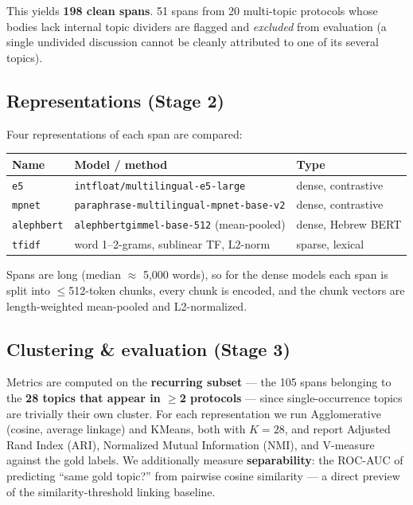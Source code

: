 \documentclass[11pt,a4paper]{article}
\begin{document}
This yields \textbf{198 clean spans}. 51 spans from 20 multi-topic protocols whose bodies lack
internal topic dividers are flagged and \emph{excluded} from evaluation (a single undivided
discussion cannot be cleanly attributed to one of its several topics).

\subsection{Representations (Stage 2)}

Four representations of each span are compared:

\begin{center}
\begin{tabular}{lll}
\toprule
\textbf{Name} & \textbf{Model / method} & \textbf{Type} \\
\midrule
\texttt{e5}        & \texttt{intfloat/multilingual-e5-large} & dense, contrastive \\
\texttt{mpnet}     & \texttt{paraphrase-multilingual-mpnet-base-v2} & dense, contrastive \\
\texttt{alephbert} & \texttt{alephbertgimmel-base-512} (mean-pooled) & dense, Hebrew BERT \\
\texttt{tfidf}     & word 1--2-grams, sublinear TF, L2-norm & sparse, lexical \\
\bottomrule
\end{tabular}
\end{center}

Spans are long (median $\approx$ 5{,}000 words), so for the dense models each span is split into
$\le$512-token chunks, every chunk is encoded, and the chunk vectors are length-weighted
mean-pooled and L2-normalized.

\subsection{Clustering \& evaluation (Stage 3)}

Metrics are computed on the \textbf{recurring subset} --- the 105 spans belonging to the
\textbf{28 topics that appear in $\ge$2 protocols} --- since single-occurrence topics are
trivially their own cluster. For each representation we run Agglomerative (cosine, average
linkage) and KMeans, both with $K=28$, and report Adjusted Rand Index (ARI), Normalized Mutual
Information (NMI), and V-measure against the gold labels. We additionally measure
\textbf{separability}: the ROC-AUC of predicting ``same gold topic?'' from pairwise cosine
similarity --- a direct preview of the similarity-threshold linking baseline.
\end{document}
